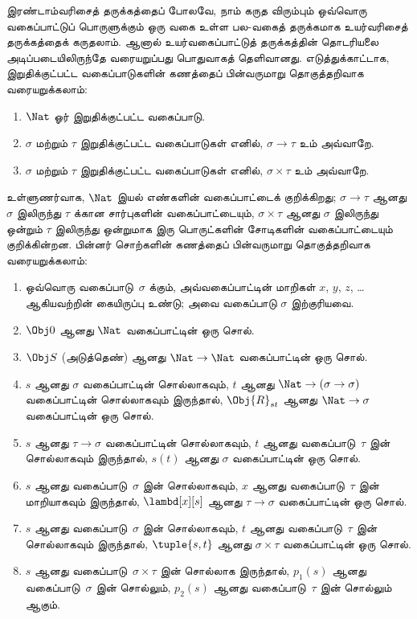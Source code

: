 \documentclass[../../../include/open-logic-section]{subfiles}
\begin{document}
இரண்டாம்வரிசைத் தருக்கத்தைப் போலவே, நாம் கருத விரும்பும் ஒவ்வொரு
வகைப்பாட்டுப் பொருளுக்கும் ஒரு வகை உள்ள பல-வகைத் தருக்கமாக
உயர்வரிசைத் தருக்கத்தைக் கருதலாம். ஆனால் உயர்வகைப்பாட்டுத் தருக்கத்தின்
தொடரியலை அடிப்படையிலிருந்தே வரையறுப்பது பொதுவாகத் தெளிவானது.
எடுத்துக்காட்டாக, இறுதிக்குட்பட்ட வகைப்பாடுகளின் கணத்தைப் பின்வருமாறு
தொகுத்தறிவாக வரையறுக்கலாம்:
\begin{enumerate}
\item $\Nat$ ஓர் இறுதிக்குட்பட்ட வகைப்பாடு.
\item $\sigma$ மற்றும் $\tau$ இறுதிக்குட்பட்ட வகைப்பாடுகள் எனில்,
  $\sigma \to \tau$ உம் அவ்வாறே.
\item $\sigma$ மற்றும் $\tau$ இறுதிக்குட்பட்ட வகைப்பாடுகள் எனில்,
  $\sigma \times \tau$ உம் அவ்வாறே.
\end{enumerate}
உள்ளுணர்வாக, $\Nat$ இயல் எண்களின் வகைப்பாட்டைக் குறிக்கிறது;
$\sigma \to \tau$ ஆனது $\sigma$ இலிருந்து $\tau$ க்கான சார்புகளின்
வகைப்பாட்டையும், $\sigma \times \tau$ ஆனது $\sigma$ இலிருந்து ஒன்றும்
$\tau$ இலிருந்து ஒன்றுமாக இரு பொருட்களின் சோடிகளின் வகைப்பாட்டையும்
குறிக்கின்றன. பின்னர் சொற்களின் கணத்தைப் பின்வருமாறு தொகுத்தறிவாக
வரையறுக்கலாம்:
\begin{enumerate}
\item ஒவ்வொரு வகைப்பாடு~$\sigma$ க்கும், அவ்வகைப்பாட்டின்
  மாறிகள் $x$, $y$, $z$, \dots ஆகியவற்றின் கையிருப்பு உண்டு; அவை
  வகைப்பாடு $\sigma$ இற்குரியவை.
\item $\Obj 0$ ஆனது $\Nat$ வகைப்பாட்டின் ஒரு சொல்.
\item $\Obj S$ (அடுத்தெண்) ஆனது $\Nat \to \Nat$ வகைப்பாட்டின் ஒரு சொல்.
\item $s$ ஆனது $\sigma$ வகைப்பாட்டின் சொல்லாகவும், $t$ ஆனது
  $\Nat \to (\sigma \to \sigma)$ வகைப்பாட்டின் சொல்லாகவும் இருந்தால்,
  $\Obj{R}_{st}$ ஆனது $\Nat \to \sigma$ வகைப்பாட்டின் ஒரு சொல்.
\item $s$ ஆனது $\tau \to \sigma$ வகைப்பாட்டின் சொல்லாகவும், $t$ ஆனது
  வகைப்பாடு~$\tau$ இன் சொல்லாகவும் இருந்தால், $s(t)$ ஆனது
  $\sigma$ வகைப்பாட்டின் ஒரு சொல்.
\item $s$ ஆனது வகைப்பாடு~$\sigma$ இன் சொல்லாகவும், $x$ ஆனது
  வகைப்பாடு~$\tau$ இன் மாறியாகவும் இருந்தால், $\lambd[x][s]$ ஆனது
  $\tau \to \sigma$ வகைப்பாட்டின் ஒரு சொல்.
\item $s$ ஆனது வகைப்பாடு~$\sigma$ இன் சொல்லாகவும், $t$ ஆனது
  வகைப்பாடு~$\tau$ இன் சொல்லாகவும் இருந்தால், $\tuple{s, t}$ ஆனது
  $\sigma \times \tau$ வகைப்பாட்டின் ஒரு சொல்.
\item $s$ ஆனது வகைப்பாடு~$\sigma \times \tau$ இன் சொல்லாக இருந்தால்,
  $p_1(s)$ ஆனது வகைப்பாடு~$\sigma$ இன் சொல்லும், $p_2(s)$ ஆனது
  வகைப்பாடு~$\tau$ இன் சொல்லும் ஆகும்.
\end{enumerate}
\end{document}
